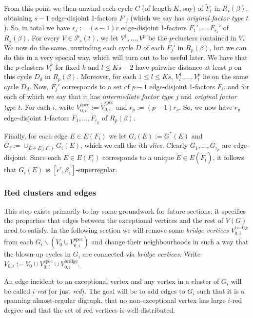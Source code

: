\documentclass[10pt,letterpaper, reqno]{amsart}
\theoremstyle{definition}
\numberwithin{equation}{section}
\begin{document}
From this point we then unwind each cycle $C$ (of length $K$, say) of $\tilde{F}_t$ in $R_s(\beta)$, obtaining $s-1$ edge-disjoint 1-factors $F'_j$ (which we say has \textit{original factor type $t$}). So, in total we have $r_s:=(s-1)\tilde{r}$ edge-disjoint 1-factors $F_1',\dots, F_{r_s}'$ of $R_s(\beta)$. For every $V \in \mathcal{P}_s(t)$, we let $V^1, \dots, V^p$ be the $p$-clusters contained in $V$. We now do the same, unwinding each cycle $D$ of each $F_j'$ in $R_p(\beta)$, but we can do this in a very special way, which will turn out to be useful later. We have that the $p$-clusters $V^k_l$ for fixed $k$ and $l \leq Ks-2$ have pairwise distance at least $p$ on this  cycle $D_d$ in $R_p(\beta)$. Moreover, for each $1\leq l \leq Ks$, $V^1_l, \dots, V^p_l$ lie on the same cycle $D_d$.
Now, $F_j'$ corresponds to a set of $p-1$ edge-disjoint 1-factors $F_i$, and for each of which we say that it has \textit{intermediate factor type $j$} and \textit{original factor type $t$}. For each $i$, write $V_{0,i}^\text{spec} := \tilde{V}_{0,i}^\text{spec}$ and $r_p :=(p-1)r_s$. So, we now have $r_p$ edge-disjoint 1-factors $F_1, \dots,F_{r_p}$ of $R_p(\beta)$.


Finally, for each edge $E \in E(F_i)$ we let $G_i(E) := G^*(E)$ and $G_i := \cup_{E \in E(F_i)}G_i(E)$, which we call the $i$th \textit{slice}. Clearly $G_1, \dots, G_{r_p}$ are edge-disjoint. Since each $E \in E(F_i)$ corresponds to a unique $\tilde{E} \in E(\tilde{F}_t)$, it follows that $G_i(E)$ is $[\epsilon',\beta_1]$-superregular. 
\subsubsection{Red clusters and edges} This step exists primarily to lay some groundwork for future sections; it specifies the properties that edges between the exceptional vertices and the rest of $V(G)$ need to satisfy. In the following section we will remove some \textit{bridge vertices} $V_{0,i}^\text{bridge}$ from each $G_i \backslash (V_0 \cup V^\text{spec}_{0,i})$ and change their neighbourhoods in such a way that the blown-up cycles in $G_i$ are connected via \textit{bridge vertices}. Write $V_{0,i} := V_0 \cup V_{0,i}^\text{spec} \cup V_{0,i}^\text{bridge}$. 

An edge incident to an exceptional vertex and any vertex in a cluster of $G_i$ will be called \textit{$i$-red} (or just \textit{red}). The goal will be to add edges to $G_i$ such that it is a spanning almost-regular digraph, that no non-exceptional vertex has large $i$-red degree and that the set of red vertices is well-distributed.
\end{document}
